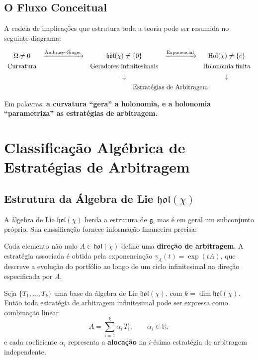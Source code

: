 \subsection{O Fluxo Conceitual}

A cadeia de implica\c{c}\~oes que estrutura toda a teoria pode ser resumida no seguinte diagrama:

\[
\begin{array}{ccccc}
 \Omega \neq 0 & \xrightarrow{\text{Ambrose--Singer}} & \mathfrak{hol}(\chi) \neq \{0\} & \xrightarrow{\text{Exponencial}} & \operatorname{Hol}(\chi) \neq \{e\} \\[4pt]
 \text{Curvatura} & & \text{Geradores infinitesimais} & & \text{Holonomia finita} \\[4pt]
 & & \downarrow & & \downarrow \\[4pt]
 & & \multicolumn{3}{c}{\text{Estrat\'egias de Arbitragem}}
\end{array}
\]

Em palavras: \textbf{a curvatura ``gera'' a holonomia, e a holonomia ``parametriza'' as estrat\'egias de arbitragem.}

\section{Classifica\c{c}\~ao Alg\'ebrica de Estrat\'egias de Arbitragem}

\subsection{Estrutura da \'Algebra de Lie \(\mathfrak{hol}(\chi)\)}

A \'algebra de Lie \(\mathfrak{hol}(\chi)\) herda a estrutura de \(\mathfrak{g}\), mas \'e em geral um subconjunto pr\'oprio. Sua classifica\c{c}\~ao fornece informa\c{c}\~ao financeira precisa:

\begin{defi}
Cada elemento n\~ao nulo \(A \in \mathfrak{hol}(\chi)\) define uma \textbf{dire\c{c}\~ao de arbitragem}. A estrat\'egia associada \'e obtida pela exponencia\c{c}\~ao \(\gamma_A(t) = \exp(tA)\), que descreve a evolu\c{c}\~ao do portf\'olio ao longo de um ciclo infinitesimal na dire\c{c}\~ao especificada por \(A\).
\end{defi}

\begin{prop}
Seja \(\{T_1, \dots, T_k\}\) uma base da \'algebra de Lie \(\mathfrak{hol}(\chi)\), com \(k = \dim \mathfrak{hol}(\chi)\). Ent\~ao toda estrat\'egia de arbitragem infinitesimal pode ser expressa como combina\c{c}\~ao linear
\begin{equation}\label{eq:linear-comb}
 A = \sum_{i=1}^{k} \alpha_i \, T_i, \qquad \alpha_i \in \mathbb{R},
\end{equation}
e cada coeficiente \(\alpha_i\) representa a \textbf{aloca\c{c}\~ao} na \(i\)-\'esima estrat\'egia de arbitragem independente.
\end{prop}

